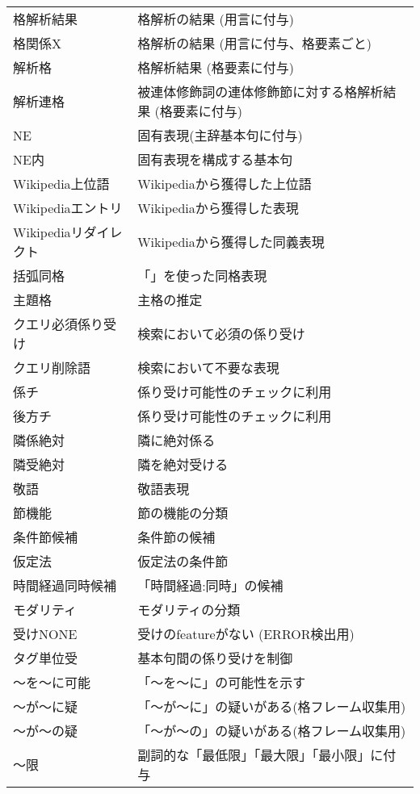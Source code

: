 \documentclass[a4j]{jarticle}
\begin{document}
\begin{supertabular}{p{4.2cm}p{9.6cm}}
格解析結果 & 格解析の結果 (用言に付与)\\
格関係X & 格解析の結果 (用言に付与、格要素ごと)\\
解析格 & 格解析結果 (格要素に付与)\\
解析連格 & 被連体修飾詞の連体修飾節に対する格解析結果 (格要素に付与)\\
NE & 固有表現(主辞基本句に付与)\\
NE内 & 固有表現を構成する基本句\\
Wikipedia上位語 & Wikipediaから獲得した上位語\\
Wikipediaエントリ & Wikipediaから獲得した表現\\
Wikipediaリダイレクト & Wikipediaから獲得した同義表現\\
括弧同格 & 「」を使った同格表現\\
主題格 & 主格の推定\\
クエリ必須係り受け & 検索において必須の係り受け\\
クエリ削除語 & 検索において不要な表現\\
係チ & 係り受け可能性のチェックに利用\\
後方チ & 係り受け可能性のチェックに利用\\
隣係絶対 & 隣に絶対係る\\
隣受絶対 & 隣を絶対受ける\\
敬語 & 敬語表現\\
節機能 & 節の機能の分類\\
条件節候補 & 条件節の候補\\
仮定法 & 仮定法の条件節\\
時間経過同時候補 & 「時間経過:同時」の候補\\
モダリティ & モダリティの分類\\
受けNONE & 受けのfeatureがない (ERROR検出用)\\
タグ単位受 & 基本句間の係り受けを制御\\
〜を〜に可能 & 「〜を〜に」の可能性を示す\\
〜が〜に疑 & 「〜が〜に」の疑いがある(格フレーム収集用)\\
〜が〜の疑 & 「〜が〜の」の疑いがある(格フレーム収集用)\\
〜限 & 副詞的な「最低限」「最大限」「最小限」に付与\\
\end{supertabular}
\end{document}
